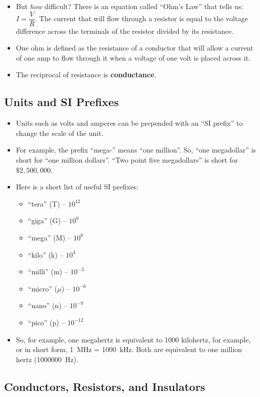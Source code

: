 \documentclass[letterpaper,12pt]{scrartcl}
\begin{document}
\begin{itemize}
\item But \textit{how} difficult? There is an equation called ``Ohm's Law'' that tells us: $I = \dfrac{V}{R}$.
The current that will flow through a resistor is equal to the voltage difference across the terminals of the resistor
divided by its resistance.
\item One ohm is defined as the resistance of a conductor that will allow a current of one amp to flow through it
when a voltage of one volt is placed across it.
\item The reciprocal of resistance is \textbf{conductance}.
\end{itemize}

\subsection{Units and SI Prefixes}

\begin{itemize}
\item Units such as volts and amperes can be prepended with an ``SI prefix'' to change the scale of the unit.
\item For example, the prefix ``mega-'' means ``one million''. So, ``one megadollar'' is short for ``one million dollars''.
``Two point five megadollars'' is short for $\$2,500,000$.
\item Here is a short list of useful SI prefixes:
\begin{itemize}
\item ``tera'' (T) -- $10^{12}$
\item ``giga'' (G) -- $10^{9}$
\item ``mega'' (M) -- $10^{6}$
\item ``kilo'' (k) -- $10^{3}$
\item ``milli'' (m) -- $10^{-3}$
\item ``micro'' ($\mu$) -- $10^{-6}$
\item ``nano'' (n) -- $10^{-9}$
\item ``pico'' (p) -- $10^{-12}$
\end{itemize}
\item So, for example, one megahertz is equivalent to 1000 kilohertz, for example, or in short form, 1~MHz = 1000~kHz.
Both are equivalent to one million hertz (1000000~Hz).
\end{itemize}

\subsection{Conductors, Resistors, and Insulators}
\end{document}
